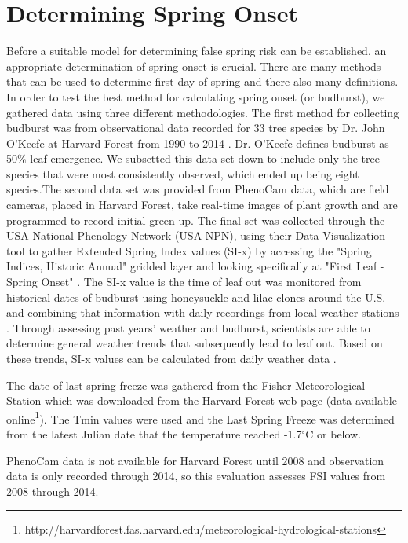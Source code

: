\documentclass{article}\usepackage[]{graphicx}\usepackage[]{color}
\begin{document}
\section{Determining Spring Onset}
Before a suitable model for determining false spring risk can be established, an appropriate determination of spring onset is crucial. There are many methods that can be used to determine first day of spring and there also many definitions. In order to test the best method for calculating spring onset (or budburst), we gathered data using three different methodologies. The first method for collecting budburst was from observational data recorded for 33 tree species by Dr. John O'Keefe at Harvard Forest from 1990 to 2014 \citep{OKeefe2014}. 
Dr. O'Keefe defines budburst as 50\% leaf emergence. We subsetted this data set down to include only the tree species that were most consistently observed, which ended up being eight species.The second data set was provided from PhenoCam data, which are field cameras, placed in Harvard Forest, take real-time images of plant growth and are programmed to record initial green up. The final set was collected through the USA National Phenology Network (USA-NPN), using their Data Visualization tool to gather Extended Spring Index values (SI-x) by accessing the "Spring Indices, Historic Annual" gridded layer and looking specifically at "First Leaf - Spring Onset" \citep{SI-x2016}. The SI-x value is the time of leaf out was monitored from historical dates of budburst using honeysuckle and lilac clones around the U.S. and combining that information with daily recordings from local weather stations \citep{USA-NPN2016, Ault2015, Ault2015a, Schwartz2013, Schwartz1997}. 
Through assessing past years' weather and budburst, scientists are able to determine general weather trends that subsequently lead to leaf out. Based on these trends, SI-x values can be calculated from daily weather data \citep{USA-NPN2016}.
\par
The date of last spring freeze was gathered from the Fisher Meteorological Station which was downloaded from the Harvard Forest web page (data available online\footnote{http://harvardforest.fas.harvard.edu/meteorological-hydrological-stations}). The Tmin values were used and the Last Spring Freeze was  determined from the latest Julian date that the temperature reached -1.7$^{\circ}$C or below. 
\par
PhenoCam data is not available for Harvard Forest until 2008 and observation data is only recorded through 2014, so this evaluation assesses FSI values from 2008 through 2014.
\end{document}
